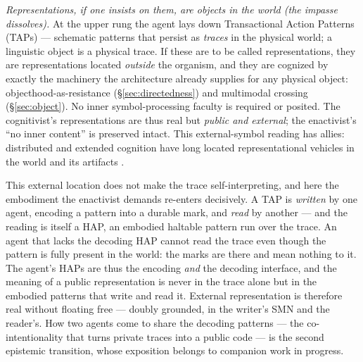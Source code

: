 \documentclass{article}
\begin{document}
\emph{Representations, if one insists on them, are objects in the world (the
impasse dissolves).}  At the upper rung the agent lays down Transactional Action
Patterns (TAPs) --- schematic patterns that persist as \emph{traces} in the
physical world; a linguistic object is a physical trace.  If these are to be
called representations, they are representations located \emph{outside} the
organism, and they are cognized by exactly the machinery the architecture
already supplies for any physical object: objecthood-as-resistance
(\S\ref{sec:directedness}) and multimodal crossing (\S\ref{sec:object}).  No
inner symbol-processing faculty is required or posited.  The cognitivist's
representations are thus real but \emph{public and external}; the enactivist's
``no inner content'' is preserved intact.  This external-symbol reading has
allies: distributed and extended cognition have long located representational
vehicles in the world and its artifacts
\citep{Hutchins1995CognitionWild,ClarkChalmers1998ExtendedMind}.

This external location does not make the trace self-interpreting, and here
the embodiment the enactivist demands re-enters decisively.  A TAP is
\emph{written} by one agent, encoding a pattern into a durable mark, and
\emph{read} by another --- and the reading is itself a HAP, an embodied
haltable pattern run over the trace.  An agent that lacks the decoding HAP
cannot read the trace even though the pattern is fully present in the world:
the marks are there and mean nothing to it.  The agent's HAPs are thus the
encoding \emph{and} the decoding interface, and the meaning of a public
representation is never in the trace alone but in the embodied patterns that
write and read it.  External representation is therefore real without
floating free --- doubly grounded, in the writer's SMN and the reader's.
How two agents come to share the decoding patterns --- the co-intentionality
that turns private traces into a public code --- is the second epistemic
transition, whose exposition belongs to companion work in progress.
\end{document}
